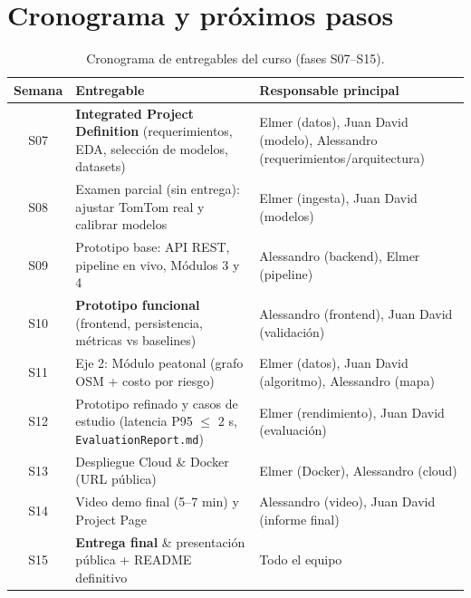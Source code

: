 \documentclass[11pt]{article}
\begin{document}
\section{Cronograma y próximos pasos}
\label{sec:cronograma}
\begin{table}[H]
\centering
\caption{Cronograma de entregables del curso (fases S07--S15).}
\label{tab:cronograma}
\begin{tabularx}{\textwidth}{cl>{\raggedright\arraybackslash}X}
\toprule
\textbf{Semana} & \textbf{Entregable} & \textbf{Responsable principal} \\
\midrule
S07 & \textbf{Integrated Project Definition} (requerimientos, EDA, selección de modelos, datasets) & Elmer (datos), Juan David (modelo), Alessandro (requerimientos/arquitectura) \\
S08 & Examen parcial (sin entrega): ajustar TomTom real y calibrar modelos & Elmer (ingesta), Juan David (modelos) \\
S09 & Prototipo base: API REST, pipeline en vivo, Módulos 3 y 4 & Alessandro (backend), Elmer (pipeline) \\
S10 & \textbf{Prototipo funcional} (frontend, persistencia, métricas vs baselines) & Alessandro (frontend), Juan David (validación) \\
S11 & Eje 2: Módulo peatonal (grafo OSM + costo por riesgo) & Elmer (datos), Juan David (algoritmo), Alessandro (mapa) \\
S12 & Prototipo refinado y casos de estudio (latencia P95 $\leq$ 2 s, \texttt{EvaluationReport.md}) & Elmer (rendimiento), Juan David (evaluación) \\
S13 & Despliegue Cloud \& Docker (URL pública) & Elmer (Docker), Alessandro (cloud) \\
S14 & Video demo final (5--7 min) y Project Page & Alessandro (video), Juan David (informe final) \\
S15 & \textbf{Entrega final} \& presentación pública + README definitivo & Todo el equipo \\
\bottomrule
\end{tabularx}
\end{table}
\end{document}

